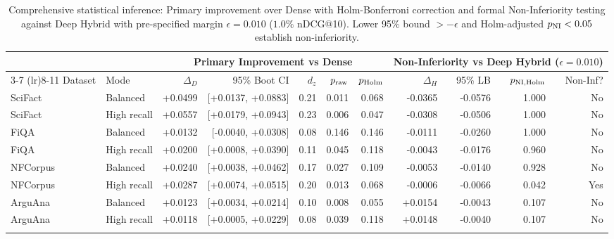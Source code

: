 \begin{table}[t]
\centering
\caption{Comprehensive statistical inference: Primary improvement over Dense with Holm-Bonferroni correction and formal Non-Inferiority testing against Deep Hybrid with pre-specified margin $\epsilon=0.010$ ($1.0\%$ nDCG@10). Lower 95\% bound $> -\epsilon$ and Holm-adjusted $p_{\rm NI}<0.05$ establish non-inferiority.}
\label{tab:statistics}
\scriptsize
\setlength{\tabcolsep}{3.0pt}
\begin{tabular}{llrrrrrrrrr}
\toprule
& & \multicolumn{5}{c}{\textbf{Primary Improvement vs Dense}} & \multicolumn{4}{c}{\textbf{Non-Inferiority vs Deep Hybrid ($\epsilon=0.010$)}} \\
\cmidrule(lr){3-7} \cmidrule(lr){8-11}
Dataset & Mode & $\Delta_D$ & 95\% Boot CI & $d_z$ & $p_{\rm raw}$ & $p_{\rm Holm}$ & $\Delta_H$ & 95\% LB & $p_{\rm NI, Holm}$ & Non-Inf? \\
\midrule
SciFact & Balanced & +0.0499 & [+0.0137, +0.0883] & 0.21 & 0.011 & 0.068 & -0.0365 & -0.0576 & 1.000 & No \\
SciFact & High recall & +0.0557 & [+0.0179, +0.0943] & 0.23 & 0.006 & 0.047 & -0.0308 & -0.0506 & 1.000 & No \\
\addlinespace[2pt]
FiQA & Balanced & +0.0132 & [-0.0040, +0.0308] & 0.08 & 0.146 & 0.146 & -0.0111 & -0.0260 & 1.000 & No \\
FiQA & High recall & +0.0200 & [+0.0008, +0.0390] & 0.11 & 0.045 & 0.118 & -0.0043 & -0.0176 & 0.960 & No \\
\addlinespace[2pt]
NFCorpus & Balanced & +0.0240 & [+0.0038, +0.0462] & 0.17 & 0.027 & 0.109 & -0.0053 & -0.0140 & 0.928 & No \\
NFCorpus & High recall & +0.0287 & [+0.0074, +0.0515] & 0.20 & 0.013 & 0.068 & -0.0006 & -0.0066 & 0.042 & Yes \\
\addlinespace[2pt]
ArguAna & Balanced & +0.0123 & [+0.0034, +0.0214] & 0.10 & 0.008 & 0.055 & +0.0154 & -0.0043 & 0.107 & No \\
ArguAna & High recall & +0.0118 & [+0.0005, +0.0229] & 0.08 & 0.039 & 0.118 & +0.0148 & -0.0040 & 0.107 & No \\
\addlinespace[2pt]
\bottomrule
\end{tabular}
\end{table}